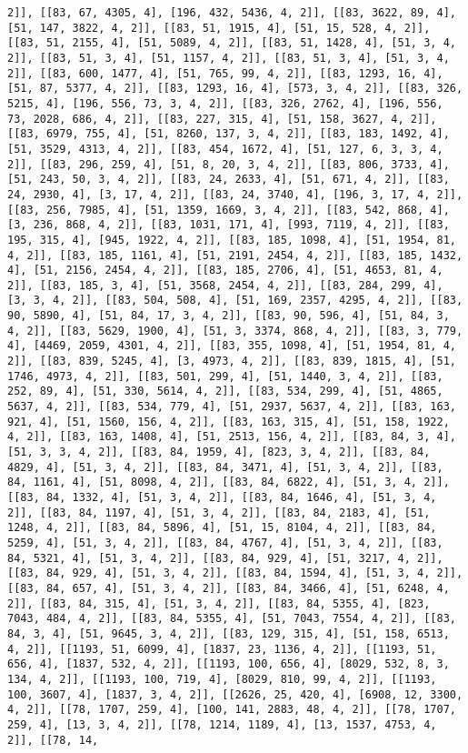\documentclass[12pt,fleqn]{article}\usepackage{../../common}
\begin{document}
\begin{verbatim}
2]], [[83, 67, 4305, 4], [196, 432, 5436, 4, 2]], [[83, 3622, 89, 4], [51, 147, 3822, 4, 2]], [[83, 51, 1915, 4], [51, 15, 528, 4, 2]], [[83, 51, 2155, 4], [51, 5089, 4, 2]], [[83, 51, 1428, 4], [51, 3, 4, 2]], [[83, 51, 3, 4], [51, 1157, 4, 2]], [[83, 51, 3, 4], [51, 3, 4, 2]], [[83, 600, 1477, 4], [51, 765, 99, 4, 2]], [[83, 1293, 16, 4], [51, 87, 5377, 4, 2]], [[83, 1293, 16, 4], [573, 3, 4, 2]], [[83, 326, 5215, 4], [196, 556, 73, 3, 4, 2]], [[83, 326, 2762, 4], [196, 556, 73, 2028, 686, 4, 2]], [[83, 227, 315, 4], [51, 158, 3627, 4, 2]], [[83, 6979, 755, 4], [51, 8260, 137, 3, 4, 2]], [[83, 183, 1492, 4], [51, 3529, 4313, 4, 2]], [[83, 454, 1672, 4], [51, 127, 6, 3, 3, 4, 2]], [[83, 296, 259, 4], [51, 8, 20, 3, 4, 2]], [[83, 806, 3733, 4], [51, 243, 50, 3, 4, 2]], [[83, 24, 2633, 4], [51, 671, 4, 2]], [[83, 24, 2930, 4], [3, 17, 4, 2]], [[83, 24, 3740, 4], [196, 3, 17, 4, 2]], [[83, 256, 7985, 4], [51, 1359, 1669, 3, 4, 2]], [[83, 542, 868, 4], [3, 236, 868, 4, 2]], [[83, 1031, 171, 4], [993, 7119, 4, 2]], [[83, 195, 315, 4], [945, 1922, 4, 2]], [[83, 185, 1098, 4], [51, 1954, 81, 4, 2]], [[83, 185, 1161, 4], [51, 2191, 2454, 4, 2]], [[83, 185, 1432, 4], [51, 2156, 2454, 4, 2]], [[83, 185, 2706, 4], [51, 4653, 81, 4, 2]], [[83, 185, 3, 4], [51, 3568, 2454, 4, 2]], [[83, 284, 299, 4], [3, 3, 4, 2]], [[83, 504, 508, 4], [51, 169, 2357, 4295, 4, 2]], [[83, 90, 5890, 4], [51, 84, 17, 3, 4, 2]], [[83, 90, 596, 4], [51, 84, 3, 4, 2]], [[83, 5629, 1900, 4], [51, 3, 3374, 868, 4, 2]], [[83, 3, 779, 4], [4469, 2059, 4301, 4, 2]], [[83, 355, 1098, 4], [51, 1954, 81, 4, 2]], [[83, 839, 5245, 4], [3, 4973, 4, 2]], [[83, 839, 1815, 4], [51, 1746, 4973, 4, 2]], [[83, 501, 299, 4], [51, 1440, 3, 4, 2]], [[83, 252, 89, 4], [51, 330, 5614, 4, 2]], [[83, 534, 299, 4], [51, 4865, 5637, 4, 2]], [[83, 534, 779, 4], [51, 2937, 5637, 4, 2]], [[83, 163, 921, 4], [51, 1560, 156, 4, 2]], [[83, 163, 315, 4], [51, 158, 1922, 4, 2]], [[83, 163, 1408, 4], [51, 2513, 156, 4, 2]], [[83, 84, 3, 4], [51, 3, 3, 4, 2]], [[83, 84, 1959, 4], [823, 3, 4, 2]], [[83, 84, 4829, 4], [51, 3, 4, 2]], [[83, 84, 3471, 4], [51, 3, 4, 2]], [[83, 84, 1161, 4], [51, 8098, 4, 2]], [[83, 84, 6822, 4], [51, 3, 4, 2]], [[83, 84, 1332, 4], [51, 3, 4, 2]], [[83, 84, 1646, 4], [51, 3, 4, 2]], [[83, 84, 1197, 4], [51, 3, 4, 2]], [[83, 84, 2183, 4], [51, 1248, 4, 2]], [[83, 84, 5896, 4], [51, 15, 8104, 4, 2]], [[83, 84, 5259, 4], [51, 3, 4, 2]], [[83, 84, 4767, 4], [51, 3, 4, 2]], [[83, 84, 5321, 4], [51, 3, 4, 2]], [[83, 84, 929, 4], [51, 3217, 4, 2]], [[83, 84, 929, 4], [51, 3, 4, 2]], [[83, 84, 1594, 4], [51, 3, 4, 2]], [[83, 84, 657, 4], [51, 3, 4, 2]], [[83, 84, 3466, 4], [51, 6248, 4, 2]], [[83, 84, 315, 4], [51, 3, 4, 2]], [[83, 84, 5355, 4], [823, 7043, 484, 4, 2]], [[83, 84, 5355, 4], [51, 7043, 7554, 4, 2]], [[83, 84, 3, 4], [51, 9645, 3, 4, 2]], [[83, 129, 315, 4], [51, 158, 6513, 4, 2]], [[1193, 51, 6099, 4], [1837, 23, 1136, 4, 2]], [[1193, 51, 656, 4], [1837, 532, 4, 2]], [[1193, 100, 656, 4], [8029, 532, 8, 3, 134, 4, 2]], [[1193, 100, 719, 4], [8029, 810, 99, 4, 2]], [[1193, 100, 3607, 4], [1837, 3, 4, 2]], [[2626, 25, 420, 4], [6908, 12, 3300, 4, 2]], [[78, 1707, 259, 4], [100, 141, 2883, 48, 4, 2]], [[78, 1707, 259, 4], [13, 3, 4, 2]], [[78, 1214, 1189, 4], [13, 1537, 4753, 4, 2]], [[78, 14, 
\end{verbatim}
\end{document}
